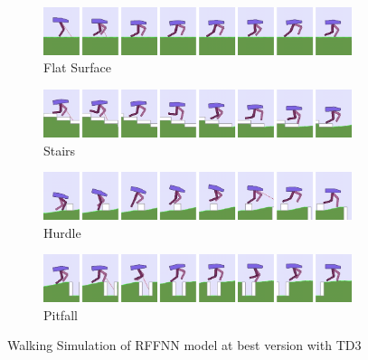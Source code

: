 \begin{figure}[!ht]
	\centering
	\begin{subfigure}{.9\textwidth}
		\centering
		\includegraphics[width=0.99\textwidth]{figures/bipedal/anim/ff_flat.png}
		\caption{Flat Surface}
		\label{fig:anim_rffnn_flat}
	\end{subfigure}
	\begin{subfigure}{.9\textwidth}
		\centering
		\includegraphics[width=0.99\textwidth]{figures/bipedal/anim/ff_stairs.png}
		\caption{Stairs}
		\label{fig:anim_rffnn_stairs}
	\end{subfigure}
	\begin{subfigure}{.9\textwidth}
		\centering
		\includegraphics[width=0.99\textwidth]{figures/bipedal/anim/ff_hurdle.png}
		\caption{Hurdle}
		\label{fig:anim_rffnn_hurdle}
	\end{subfigure}
	\begin{subfigure}{.9\textwidth}
		\centering
		\includegraphics[width=0.99\textwidth]{figures/bipedal/anim/ff_pitfall.png}
		\caption{Pitfall}
		\label{fig:anim_rffnn_pitfall}
	\end{subfigure}
	\caption{Walking Simulation of RFFNN model at best version with TD3}
	\label{fig:rffnn_simulation}
\end{figure}


